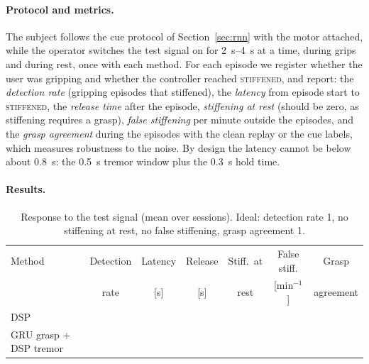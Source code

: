 \paragraph{Protocol and metrics.}
The subject follows the cue protocol of Section~\ref{sec:rnn} with the motor attached,
while the operator switches the test signal on for \SIrange{2}{4}{s} at a time, during
grips and during rest, once with each method. For each episode we register whether the
user was gripping and whether the controller reached \textsc{stiffened}, and report:
the \emph{detection rate} (gripping episodes that stiffened), the \emph{latency} from
episode start to \textsc{stiffened}, the \emph{release time} after the episode,
\emph{stiffening at rest} (should be zero, as stiffening requires a grasp),
\emph{false stiffening} per minute outside the episodes, and the \emph{grasp agreement}
during the episodes with the clean replay or the cue labels, which measures robustness
to the noise. By design the latency cannot be below about \SI{0.8}{s}: the
\SI{0.5}{s} tremor window plus the \SI{0.3}{s} hold time.

\paragraph{Results.}

\begin{table}[h]
  \centering
  \small
  \caption{Response to the test signal (mean over sessions). Ideal: detection rate 1,
  no stiffening at rest, no false stiffening, grasp agreement 1.}
  \label{tab:evaluation}
  \begin{tabular}{lcccccc}
    \toprule
    Method & Detection & Latency & Release & Stiff.\ at & False stiff. & Grasp \\
           & rate      & [s]     & [s]     & rest       & [min$^{-1}$] & agreement \\
    \midrule
    DSP                    & \todo{} & \todo{} & \todo{} & \todo{} & \todo{} & \todo{} \\
    GRU grasp + DSP tremor & \todo{} & \todo{} & \todo{} & \todo{} & \todo{} & \todo{} \\
    \bottomrule
  \end{tabular}
\end{table}

